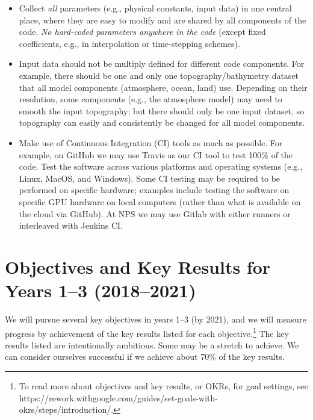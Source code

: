 \documentclass{article}
\begin{document}
\begin{itemize}
    \item Collect \emph{all} parameters (e.g., physical constants, input data) in one central place, where they are easy to modify and are shared by all components of the code. \emph{No hard-coded parameters anywhere in the code} (except fixed coefficients, e.g., in interpolation or time-stepping schemes). 
    \item Input data should not be multiply defined for different code components. For example, there should be one and only one topography/bathymetry dataset that all model components (atmosphere, ocean, land) use. Depending on their resolution, some components (e.g., the atmosphere model) may need to smooth the input topography; but there should only be one input dataset, so topography can easily and consistently be changed for all model components.
    \item Make use of Continuous Integration (CI) tools as much as possible.  For example, on GitHub we may use Travis as our CI tool to test 100\% of the code. Test the software across various platforms and operating systems (e.g., Linux, MacOS, and Windows).  Some CI testing may be required to be performed on specific hardware; examples include testing the software on specific GPU hardware on local computers (rather than what is available on the cloud via GitHub).  At NPS we may use Gitlab with either runners or interleaved with Jenkins CI.
\end{itemize}

\section{Objectives and Key Results for Years 1--3 (2018--2021)}

We will pursue several key objectives in years 1--3 (by 2021), and we will measure progress by achievement of the key results listed for each objective.\footnote{To read more about objectives and key results, or OKRs, for goal settings, see https://rework.withgoogle.com/guides/set-goals-with-okrs/steps/introduction/.} The key results listed are intentionally ambitious. Some may be a stretch to achieve. We can consider ourselves successful if we achieve about 70\% of the key results. 
 
\end{document}
